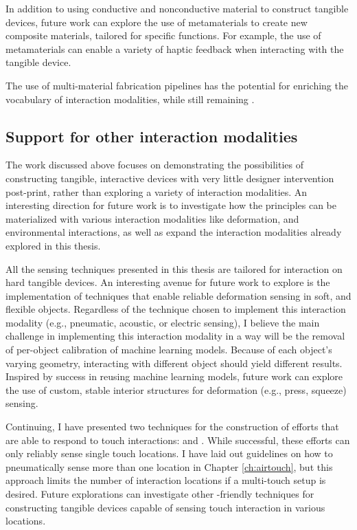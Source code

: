       In addition to using conductive and nonconductive material to construct
      tangible devices, future work can explore the use of metamaterials to
      create new composite materials, tailored for specific functions. For
      example, the use of  metamaterials can enable a variety
      of haptic feedback when interacting with the tangible device.

      The use of multi-material fabrication pipelines has the potential for
      enriching the vocabulary of interaction modalities, while still remaining
      \pap.

    \subsection{Support for other interaction modalities}
      The work discussed above focuses on demonstrating the possibilities of
      constructing tangible, interactive devices with very little designer
      intervention post-print, rather than exploring a variety of interaction
      modalities. An interesting direction for future work is to investigate how
      the \papf principles can be materialized with various interaction
      modalities like deformation, and environmental interactions, as well as
      expand the interaction modalities already explored in this thesis.

      All the sensing techniques presented in this thesis are tailored for
      interaction on hard tangible devices. An interesting avenue for future
      work to explore is the implementation of \pap techniques that enable
      reliable deformation sensing in soft, and flexible objects. Regardless of
      the technique chosen to implement this interaction modality (e.g.,
      pneumatic, acoustic, or electric sensing), I believe the main challenge in
      implementing this interaction modality in a \pap way will be the removal
      of per-object calibration of machine learning models. Because of each
      object's varying geometry, interacting with different object should yield
      different results. Inspired by \at success in reusing machine learning
      models, future work can explore the use of custom, stable interior
      structures for deformation (e.g., press, squeeze) sensing.

      Continuing, I have presented two techniques for the construction of
      efforts that are able to respond to touch interactions: \at and \al. While
      successful, these efforts can only reliably sense single touch locations.
      I have laid out guidelines on how to pneumatically sense more than one
      location in Chapter \ref{ch:airtouch}, but this approach limits the number
      of interaction locations if a multi-touch setup is desired. Future
      explorations can investigate other \pap-friendly techniques for
      constructing tangible devices capable of sensing touch interaction in
      various locations.

